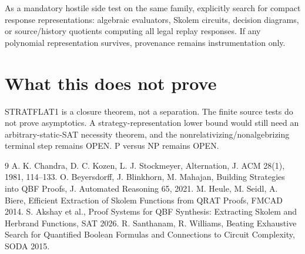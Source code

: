 \documentclass[11pt]{article}
\begin{document}
As a mandatory hostile side test on the same family, explicitly search for compact response
representations: algebraic evaluators, Skolem circuits, decision diagrams, or source/history
quotients computing all legal replay responses. If any polynomial representation survives,
provenance remains instrumentation only.

\section*{What this does not prove}
STRATFLAT1 is a closure theorem, not a separation. The finite source tests do not prove asymptotics.
A strategy-representation lower bound would still need an arbitrary-static-SAT necessity theorem,
and the nonrelativizing/nonalgebrizing terminal step remains OPEN. P versus NP remains OPEN.

\begin{thebibliography}{9}
 A. K. Chandra, D. C. Kozen, L. J. Stockmeyer,
Alternation, J. ACM 28(1), 1981, 114--133.
 O. Beyersdorff, J. Blinkhorn, M. Mahajan,
Building Strategies into QBF Proofs, J. Automated Reasoning 65, 2021.
 M. Heule, M. Seidl, A. Biere,
Efficient Extraction of Skolem Functions from QRAT Proofs, FMCAD 2014.
 S. Akshay et al.,
Proof Systems for QBF Synthesis: Extracting Skolem and Herbrand Functions, SAT 2026.
 R. Santhanam, R. Williams,
Beating Exhaustive Search for Quantified Boolean Formulas and Connections to Circuit Complexity,
SODA 2015.
\end{thebibliography}
\end{document}
